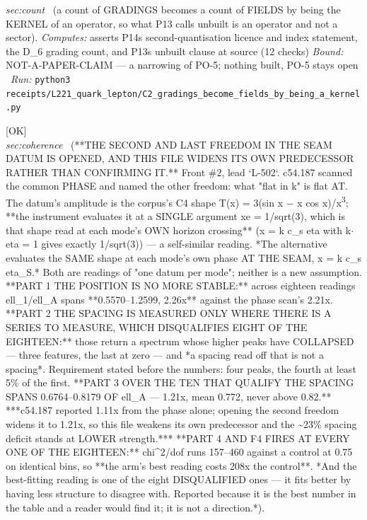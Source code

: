 \begin{description}
\textit{sec:count} \ (a count of GRADINGS becomes a count of FIELDS by being the KERNEL of an operator, so what P13 calls unbuilt is an operator and not a sector). 
\emph{Computes:} asserts P14s second-quantisation licence and index statement, the D\_6 grading count, and P13s unbuilt clause at source (12 checks)
 \emph{Bound:} NOT-A-PAPER-CLAIM --- a narrowing of PO-5; nothing built, PO-5 stays open
\ \emph{Run:} \texttt{python3 receipts/L221\_quark\_lepton/C2\_gradings\_become\_fields\_by\_being\_a\_kernel.py}
\item[\label{rcpt:P15_both_datum_freedoms_opened_and_the_spacing_still_holds}\texttt{P15\_both\_datum\_freedoms\_opened\_and\_the\_spacing\_still\_holds}]\hfill\textsf{[OK]}\\
\textit{sec:coherence} \ (**THE SECOND AND LAST FREEDOM IN THE SEAM DATUM IS OPENED, AND THIS FILE WIDENS ITS OWN PREDECESSOR RATHER THAN CONFIRMING IT.** Front \#2, lead `L-502`. c54.187 scanned the common PHASE and named the other freedom: what "flat in k" is flat AT. The datum's amplitude is the corpus's C4 shape T(x) = 3(sin x \ensuremath{-} x cos x)/x\textsuperscript{3}; **the instrument evaluates it at a SINGLE argument xe = 1/sqrt(3), which is that shape read at each mode's OWN horizon crossing** (x = k c\_s eta with k\ensuremath{\cdot}eta = 1 gives exactly 1/sqrt(3)) --- a self-similar reading. *The alternative evaluates the SAME shape at each mode's own phase AT THE SEAM, x = k c\_s eta\_S.* Both are readings of "one datum per mode"; neither is a new assumption. **PART 1 THE POSITION IS NO MORE STABLE:** across eighteen readings ell\_1/ell\_A spans **0.5570--1.2599, 2.26x** against the phase scan's 2.21x. **PART 2 THE SPACING IS MEASURED ONLY WHERE THERE IS A SERIES TO MEASURE, WHICH DISQUALIFIES EIGHT OF THE EIGHTEEN:** those return a spectrum whose higher peaks have COLLAPSED --- three features, the last at zero --- and *a spacing read off that is not a spacing*. Requirement stated before the numbers: four peaks, the fourth at least 5\% of the first. **PART 3 OVER THE TEN THAT QUALIFY THE SPACING SPANS 0.6764--0.8179 OF ell\_A --- 1.21x, mean 0.772, never above 0.82.**  ***c54.187 reported 1.11x from the phase alone; opening the second freedom widens it to 1.21x, so this file weakens its own predecessor and the \textasciitilde{}23\% spacing deficit stands at LOWER strength.*** **PART 4 AND F4 FIRES AT EVERY ONE OF THE EIGHTEEN:** chi\textasciicircum{}2/dof runs 157--460 against a control at 0.75 on identical bins, so **the arm's best reading costs 208x the control**.  *And the best-fitting reading is one of the eight DISQUALIFIED ones --- it fits better by having less structure to disagree with. Reported because it is the best number in the table and a reader would find it; it is not a direction.*). 

\end{description}

